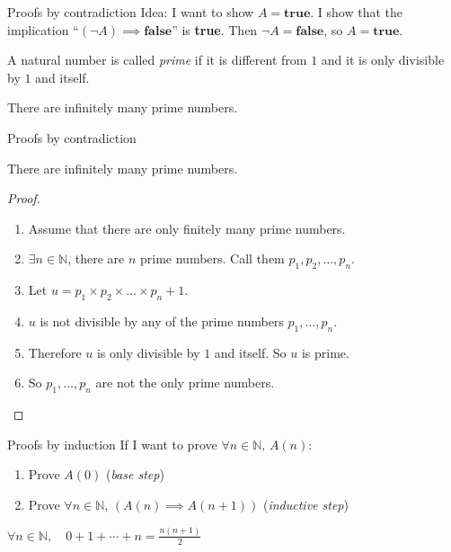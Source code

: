 \documentclass[11pt]{beamer}
\theoremstyle{definition}
\begin{document}
\begin{frame}{Proofs by contradiction}
  Idea: I want to show $A=\textbf{true}$. I show that the implication
  ``$(\neg A)\implies\textbf{false}$'' is \textbf{true}.
  Then $\neg A=\textbf{false}$, so $A=\textbf{true}$.
  \pause
\begin{definition}
  A natural number is called \emph{prime} if it is different from $1$ and it
  is only divisible by $1$ and itself.
\end{definition}
  \begin{theorem}
    There are infinitely many prime numbers.
  \end{theorem}

\end{frame}

\begin{frame}{Proofs by contradiction}
  \begin{theorem}
    There are infinitely many prime numbers.
  \end{theorem}
  \pause
  \begin{proof}
    \begin{enumerate}
    \item Assume that there are only finitely many prime numbers.
    \pause
    \item $\exists n\in \mathbb N$, there are $n$ prime numbers. Call them
          $p_1,p_2,\dots,p_n$.
    \pause
    \item Let $u=p_1\times p_2\times \dots \times p_n +1$.
    \pause
    \item $u$ is not divisible by any of the prime numbers $p_1,\dots,p_n$.
    \pause
    \item Therefore $u$ is only divisible by $1$ and itself. So $u$ is prime.
    \pause
    \item So $p_1,\dots,p_n$ are not the only prime numbers.
    \end{enumerate}
  \end{proof}

\end{frame}



\begin{frame}{Proofs by induction}
  If I want to prove $\forall n\in \mathbb N,\, A(n)$:
  \begin{enumerate}
    \item Prove $A(0)$ (\emph{base step})
    \item Prove $\forall n\in \mathbb N,\, (A(n)\implies A(n+1))$
    (\emph{inductive step})
  \end{enumerate}
  \pause
  \begin{theorem}
    $\forall n\in \mathbb N,\quad 0+1+\cdots + n=\frac{n(n+1)}{2}$
  \end{theorem}

\end{frame}
\end{document}
